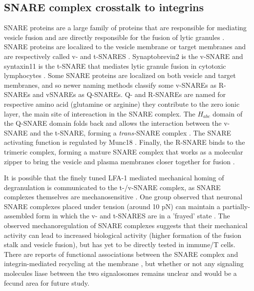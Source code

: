 \subsection{SNARE complex crosstalk to integrins}
SNARE proteins are a large family of proteins that are responsible for mediating vesicle fusion and are directly responsible for the fusion of lytic granules \cite{Chang2017}. SNARE proteins are localized to the vesicle membrane or target membranes and are respectively called v- and t-SNARES \cite{Yoon2018}. Synaptobrevin2 is the v-SNARE and syntaxin11 is the t-SNARE that mediates lytic granule fusion in cytotoxic lymphocytes \cite{Halimani2014, Chitirala2019, Matti2013}. Some SNARE proteins are localized on both vesicle and target membranes, and so newer naming methods classify some v-SNAREs as R-SNAREs and vSNAREs as Q-SNAREs. Q- and R-SNAREs are named for respective amino acid (glutamine or arginine) they contribute to the zero ionic layer, the main site of intereaction in the SNARE complex. The $H_{abc}$ domain of the Q-SNARE domain folds back and allows the interaction between the v-SNARE and the t-SNARE, forming a \textit{trans-}SNARE complex \cite{Yoon2018}. The SNARE activating function is regulated by Munc18 \cite{Spessott2017, Yoon2018, Baker2015}. Finally, the R-SNARE binds to the trimeric complex, forming a mature SNARE complex that works as a molecular zipper to bring the vesicle and plasma membranes closer together for fusion \cite{Agostino2017}.

It is possible that the finely tuned LFA-1 mediated mechanical homing of degranulation is communicated to the t-/v-SNARE complex, as SNARE complexes themselves are mechanosensitive \cite{Risselada2020}. One group observed that neuronal SNARE complexes placed under tension (around 10 pN) can maintain a partially-assembled form in which the v- and t-SNARES are in a 'frayed' state \cite{Zhou2017}. The observed mechanoregulation of SNARE complexes suggests that their mechanical activity can lead to increased biological activity (higher formation of the fusion stalk and vesicle fusion), but has yet to be directly tested in immune/T cells. There are reports of functional associations between the SNARE complex and integrin-mediated recycling at the membrane \cite{Riggs2012, Zhuang2020, Nagy2009}, but whether or not any signaling molecules liase between the two signalosomes remains unclear and would be a fecund area for future study. 

